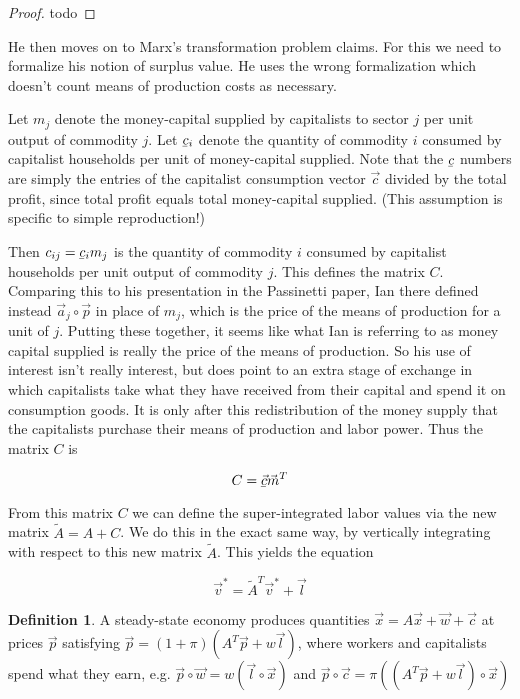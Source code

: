 \documentclass{article}
\newcommand{\ubar}[1]{\underaccent{\bar}{#1}}
\theoremstyle{definition}
\newtheorem{definition}{Definition}[section]
\begin{document}
\begin{proof}
    todo
\end{proof}

He then moves on to Marx's transformation problem claims. For this we need to formalize his notion of surplus value. He uses the wrong formalization which doesn't count means of production costs as necessary. 

Let $m_j$ denote the money-capital supplied by capitalists to sector $j$ per unit output of commodity $j$. Let $\ubar{c}_i$ denote the quantity of commodity $i$ consumed by capitalist households per unit of money-capital supplied. Note that the $\ubar{c}$ numbers are simply the entries of the capitalist consumption vector $\vec{c}$ divided by the total profit, since total profit equals total money-capital supplied. (This assumption is specific to simple reproduction!)

Then $c_{ij} = \ubar{c}_im_j$ is the quantity of commodity $i$ consumed by capitalist households per unit output of commodity $j$. This defines the matrix $C$. Comparing this to his presentation in the Passinetti paper, Ian there defined instead $\vec{a}_j \circ \vec{p}$ in place of $m_j$, which is the price of the means of production for a unit of $j$. Putting these together, it seems like what Ian is referring to as money capital supplied is really the price of the means of production. So his use of interest isn't really interest, but does point to an extra stage of exchange in which capitalists take what they have received from their capital and spend it on consumption goods. It is only after this redistribution of the money supply that the capitalists purchase their means of production and labor power. Thus the matrix $C$ is

\begin{equation}
    C = \ubar{\vec{c}}\vec{m}^T
\end{equation}

From this matrix $C$ we can define the super-integrated labor values via the new matrix $\tilde{A}=A+C$. We do this in the exact same way, by vertically integrating with respect to this new matrix $\tilde{A}$. This yields the equation

\begin{equation}
    \vec{v}^*=\tilde{A}^T\vec{v}^*+\vec{l}
\end{equation}

\begin{definition}
    A steady-state economy produces quantities $\vec{x} = A\vec{x}+\vec{w}+\vec{c}$ at prices $\vec{p}$ satisfying $\vec{p}=(1+\pi)(A^T\vec{p}+w\vec{l})$, where workers and capitalists spend what they earn, e.g. $\vec{p}\circ\vec{w} = w(\vec{l}\circ\vec{x})$ and $\vec{p}\circ\vec{c} = \pi((A^T\vec{p}+w\vec{l})\circ\vec{x})$
\end{definition}
\end{document}
